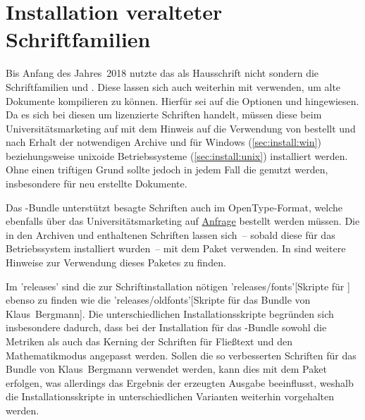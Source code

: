 \section{%
  Installation veralteter Schriftfamilien%
  \label{sec:install:fonts}%
}

Bis Anfang des Jahres~2018 nutzte das \TUDCD als Hausschrift nicht \OpenSans 
sondern die Schriftfamilien \Univers und \DIN. Diese lassen sich auch weiterhin 
mit \TUDScript verwenden, um alte Dokumente kompilieren zu können. Hierfür sei 
auf die Optionen  und  hingewiesen. 
Da es sich bei diesen um lizenzierte Schriften handelt, müssen diese beim 
Universitätsmarketing auf  mit dem 
Hinweis auf die Verwendung von  bestellt und nach Erhalt der 
notwendigen Archive  und  für 
Windows (\autoref{sec:install:win}) beziehungsweise unixoide Betriebssysteme 
(\autoref{sec:install:unix}) installiert werden. Ohne einen triftigen Grund 
sollte jedoch in jedem Fall die \OpenSans genutzt werden, insbesondere für neu 
erstellte Dokumente.

Das \TUDScript-Bundle unterstützt besagte Schriften auch im OpenType-Format, 
welche ebenfalls über das Universitätsmarketing auf 
\href{https://tu-dresden.de/cd}{Anfrage} bestellt werden müssen. Die in den 
Archiven  und  enthaltenen 
Schriften lassen sich~-- sobald diese für das Betriebssystem installiert 
wurden~-- mit dem Paket  verwenden. In  
sind weitere Hinweise zur Verwendung dieses Paketes zu finden.

Im \GitHubRepo'releases' sind die zur Schriftinstallation nötigen 
\GitHubRepo'releases/fonts'[Skripte für \TUDScript] ebenso zu finden wie die
\GitHubRepo'releases/oldfonts'[Skripte für das Bundle von Klaus~Bergmann]. Die 
unterschiedlichen Installationsskripte begründen sich insbesondere dadurch, 
dass bei der Installation für das \TUDScript-Bundle sowohl die Metriken als 
auch das Kerning der Schriften für Fließtext und den Mathematikmodus angepasst 
werden. Sollen die so verbesserten Schriften für das Bundle von Klaus~Bergmann 
verwendet werden, kann dies mit dem Paket  erfolgen, 
was allerdings das Ergebnis der erzeugten Ausgabe beeinflusst, weshalb die 
Installationsskripte in unterschiedlichen Varianten weiterhin vorgehalten 
werden.


